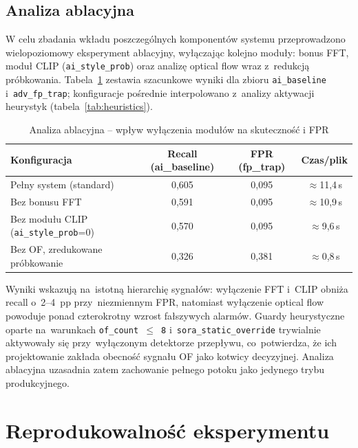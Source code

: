 \subsection*{Analiza ablacyjna}
W celu zbadania wkładu poszczególnych komponentów systemu przeprowadzono wielopoziomowy
eksperyment ablacyjny, wyłączając kolejno moduły: bonus FFT, moduł CLIP (\texttt{ai\_style\_prob})
oraz analizę optical flow wraz z~redukcją próbkowania.
Tabela~\ref{tab:ablation} zestawia szacunkowe wyniki dla zbioru \texttt{ai\_baseline}
i~\texttt{adv\_fp\_trap}; konfiguracje pośrednie interpolowano z~analizy aktywacji
heurystyk (tabela~\ref{tab:heuristics}).
\begin{table}[h]
\centering
\caption{Analiza ablacyjna -- wpływ wyłączenia modułów na skuteczność i FPR}
\label{tab:ablation}
\begin{tabular}{lccc}
\hline
\textbf{Konfiguracja} & \textbf{Recall (ai\_baseline)} & \textbf{FPR (fp\_trap)} & \textbf{Czas/plik} \\
\hline
Pełny system (standard) & 0{,}605 & 0{,}095 & $\approx$11{,}4\,s \\
Bez bonusu FFT & 0{,}591 & 0{,}095 & $\approx$10{,}9\,s \\
Bez modułu CLIP (\texttt{ai\_style\_prob}=0) & 0{,}570 & 0{,}095 & $\approx$9{,}6\,s \\
Bez OF, zredukowane próbkowanie & 0{,}326 & 0{,}381 & $\approx$0{,}8\,s \\
\hline
\end{tabular}
\end{table}
Wyniki wskazują na~istotną hierarchię sygnałów: wyłączenie FFT i~CLIP obniża recall
o~2--4~pp przy~niezmiennym FPR, natomiast wyłączenie optical flow powoduje
ponad czterokrotny wzrost fałszywych alarmów. Guardy heurystyczne oparte na~warunkach
\texttt{of\_count~$\leq$~8} i~\texttt{sora\_static\_override} trywialnie aktywowały
się przy~wyłączonym detektorze przepływu, co~potwierdza, że ich projektowanie zakłada
obecność sygnału OF jako kotwicy decyzyjnej.
Analiza ablacyjna uzasadnia zatem zachowanie pełnego potoku jako jedynego trybu produkcyjnego.

\section{Reprodukowalność eksperymentu}
\label{sec:reprodukowalnosc}

